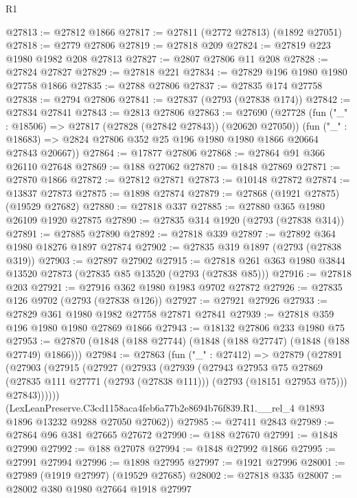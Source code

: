 \begin{lexlean}{R1}
\begin{coremodule}
@27813 := @27812 @1866
@27817 := @27811 (@2772 @27813) (@1892 @27051)
@27818 := @2779 @27806
@27819 := @27818 @209
@27824 := @27819 @223 @1980 @1982 @208 @27813
@27827 := @2807 @27806 @11 @208
@27828 := @27824 @27827
@27829 := @27818 @221
@27834 := @27829 @196 @1980 @1980 @27758 @1866
@27835 := @2788 @27806
@27837 := @27835 @174 @27758
@27838 := @2794 @27806
@27841 := @27837 (@2793 (@27838 @174))
@27842 := @27834 @27841
@27843 := @2813 @27806
@27863 := @27690
    (@27728
      (fun ("_" : @18506) => @27817 (@27828 (@27842 @27843)) (@20620 @27050))
      (fun ("_" : @18683) => @2824 @27806 @352 @25 @196 @1980 @1980 @1866 @20664 @27843 @20667))
@27864 := @17877 @27806
@27868 := @27864 @91 @366 @26110 @27648
@27869 := @188 @27062
@27870 := @1848 @27869
@27871 := @27870 @1866
@27872 := @27812 @27871
@27873 := @10148 @27872
@27874 := @13837 @27873
@27875 := @1898 @27874
@27879 := @27868 (@1921 @27875) (@19529 @27682)
@27880 := @27818 @337
@27885 := @27880 @365 @1980 @26109 @1920 @27875
@27890 := @27835 @314 @1920 (@2793 (@27838 @314))
@27891 := @27885 @27890
@27892 := @27818 @339
@27897 := @27892 @364 @1980 @18276 @1897 @27874
@27902 := @27835 @319 @1897 (@2793 (@27838 @319))
@27903 := @27897 @27902
@27915 := @27818 @261 @363 @1980 @3844 @13520 @27873 (@27835 @85 @13520 (@2793 (@27838 @85)))
@27916 := @27818 @203
@27921 := @27916 @362 @1980 @1983 @9702 @27872
@27926 := @27835 @126 @9702 (@2793 (@27838 @126))
@27927 := @27921 @27926
@27933 := @27829 @361 @1980 @1982 @27758 @27871 @27841
@27939 := @27818 @359 @196 @1980 @1980 @27869 @1866
@27943 := @18132 @27806 @233 @1980 @75
@27953 := @27870 (@1848 (@188 @27744) (@1848 (@188 @27747) (@1848 (@188 @27749) @1866)))
@27984 := @27863
    (fun ("_" : @27412) =>
    @27879
      (@27891
        (@27903
          (@27915
            (@27927
              (@27933
                (@27939
                  (@27943
                    @27953
                    @75
                    @27869
                    (@27835 @111 @27771 (@2793 (@27838 @111)))
                    (@2793 (@18151 @27953 @75)))
                  @27843))))))
      (LexLeanPreserve.C3cd1158aca4feb6a77b2e8694b76f839.R1.__rel_4
        @1893
        @1896
        @13232
        @9288
        @27050
        @27062))
@27985 := @27411 @2843
@27989 := @27864 @96 @381 @27665 @27672
@27990 := @188 @27670
@27991 := @1848 @27990
@27992 := @188 @27078
@27994 := @1848 @27992 @1866
@27995 := @27991 @27994
@27996 := @1898 @27995
@27997 := @1921 @27996
@28001 := @27989 (@1919 @27997) (@19529 @27685)
@28002 := @27818 @335
@28007 := @28002 @380 @1980 @27664 @1918 @27997

\end{coremodule}
\end{lexlean}
